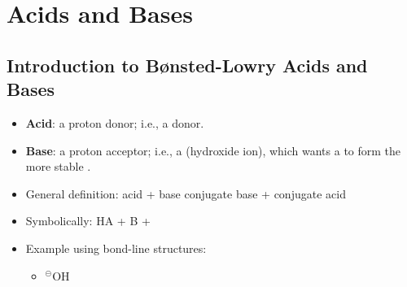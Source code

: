 \documentclass[12pt,a4paper]{article}
\begin{document}

\clearpage
\section{Acids and Bases}
\subsection{Introduction to B{\o}nsted-Lowry Acids and Bases}
\begin{itemize}
    \item \textbf{Acid}: a {\color{o-Sun}proton donor}; i.e., a {\color{pos}} donor.
    \item \textbf{Base}: a {\color{o-Sun}proton acceptor}; i.e., a {\color{neg}} (hydroxide ion), which wants a {\color{pos}} to form the more stable .
    \item General definition: {\color{pos}acid} + {\color{neg}base} \ch{<>} {\color{neg}conjugate base} + {\color{pos}conjugate acid}
    \item Symbolically: {\color{pos}HA} + {\color{neg}B} \ch{<>} {\color{neg}} + {\color{pos}}
    \item Example using bond-line structures:
        \begin{itemize}
            \item 
            \hspace{6pt}{\large+}\hspace{6pt}
            \hspace{6pt}{\large\ch{<>}}\hspace{6pt}
            {\color{neg}$^\circleddash$O}H
            \hspace{6pt}{\large+}\hspace{6pt}
    \end{itemize}
\end{itemize}
\end{document}
